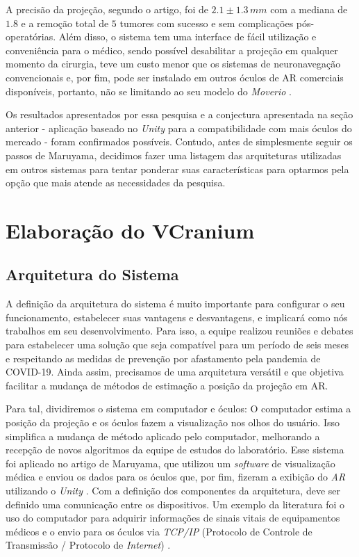 A precisão da projeção, segundo o artigo, foi de \(2.1 \pm  1.3\,mm\) com a mediana de \(1.8\) e a remoção total de \(5\) tumores com sucesso e sem complicações pós-operatórias. Além disso, o sistema tem uma interface de fácil utilização e conveniência para o médico, sendo possível desabilitar a projeção em qualquer momento da cirurgia, teve um custo menor que os sistemas de neuronavegação convencionais e, por fim, pode ser instalado em outros óculos de AR comerciais disponíveis, portanto, não se limitando ao seu modelo do \textit{Moverio} \cite{Maruyama2018}.

Os resultados apresentados por essa pesquisa e a conjectura apresentada na seção anterior - aplicação baseado no \textit{Unity} para a compatibilidade com mais óculos do mercado - foram confirmados possíveis. Contudo, antes de simplesmente seguir os passos de Maruyama, decidimos fazer uma listagem das arquiteturas utilizadas em outros sistemas para tentar ponderar suas características para optarmos pela opção que mais atende as necessidades da pesquisa.

\section{Elaboração do VCranium}\label{chp:criacao-vcranium} 

\subsection{Arquitetura do Sistema}

A definição da arquitetura do sistema é muito importante para configurar o seu funcionamento, estabelecer suas vantagens e desvantagens, e implicará como nós trabalhos em seu desenvolvimento. Para isso, a equipe realizou reuniões e debates para estabelecer uma solução que seja compatível para um período de seis meses e respeitando as medidas de prevenção por afastamento pela pandemia de COVID-19. Ainda assim, precisamos de uma arquitetura versátil e que objetiva facilitar a mudança de métodos de estimação a posição da projeção em AR. 

Para tal, dividiremos o sistema em computador e óculos: O computador estima a posição da projeção e os óculos fazem a visualização nos olhos do usuário. Isso simplifica a mudança de método aplicado pelo computador, melhorando a recepção de novos algoritmos da equipe de estudos do laboratório. Esse sistema foi aplicado no artigo de Maruyama, que utilizou um \textit{software} de visualização médica e enviou os dados para os óculos que, por fim, fizeram a exibição do \textit{AR} utilizando o \textit{Unity} \cite{Maruyama2018}. Com a definição dos componentes da arquitetura, deve ser definido uma comunicação entre os dispositivos. Um exemplo da literatura foi o uso do computador para adquirir informações de sinais vitais de equipamentos médicos e o envio para os óculos via \textit{TCP/IP} (Protocolo de Controle de Transmissão / Protocolo de \textit{Internet}) \cite{Arpaia2021}.

